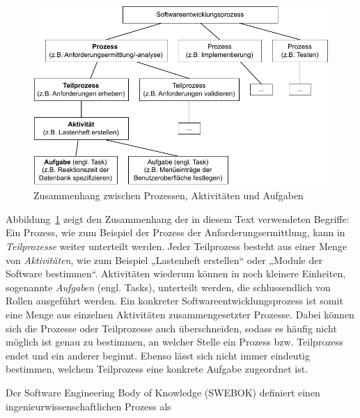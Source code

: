 \begin{figure}[h!]
	\centering
	\includegraphics[scale=1.0]{Bilder/Kapitel-1/Abb-1-6.pdf}
	\caption{Zusammenhang zwischen Prozessen, Aktivitäten und Aufgaben}
	\label{fig:prozesse_aktivitaeten_aufgaben}
\end{figure}

Abbildung~\ref{fig:prozesse_aktivitaeten_aufgaben} zeigt den Zusammenhang  der in diesem Text verwendeten Begriffe: Ein Prozess, wie zum Beispiel der Prozess der Anforderungsermittlung, kann in \mbox{\textit{Teilprozesse}} weiter unterteilt werden. Jeder Teilprozess besteht aus einer Menge von \textit{Aktivitäten}, wie zum Beispiel „Lastenheft erstellen“ oder „Module der Software bestimmen“. Aktivitäten wiederum können in noch kleinere Einheiten, sogenannte \textit{Aufgaben} (engl. Tasks), unterteilt werden, die schlussendlich von Rollen ausgeführt werden. Ein konkreter Softwareentwicklungsprozess ist somit eine Menge aus einzelnen Aktivitäten zusammengesetzter Prozesse. Dabei können sich die Prozesse oder Teilprozesse auch überschneiden, sodass es häufig nicht möglich ist genau zu bestimmen, an welcher Stelle ein Prozess bzw. Teilprozess endet und ein anderer beginnt. Ebenso lässt sich nicht immer eindeutig bestimmen, welchem Teilprozess eine konkrete Aufgabe zugeordnet ist. 

Der Software Engineering Body of Knowledge (SWEBOK) definiert einen ingenieurwissenschaftlichen Prozess als


